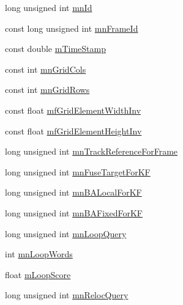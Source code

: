 \begin{DoxyCompactItemize}
\item 
long unsigned int \mbox{\hyperlink{class_o_r_b___s_l_a_m2_1_1_key_frame_a1e3d56caca4e4cc372c36a3270d490c7}{mn\+Id}}
\item 
const long unsigned int \mbox{\hyperlink{class_o_r_b___s_l_a_m2_1_1_key_frame_a75ad29c06d8c969a341d9f633b43569e}{mn\+Frame\+Id}}
\item 
const double \mbox{\hyperlink{class_o_r_b___s_l_a_m2_1_1_key_frame_ab4fa3d61a524547cfe2be2523d199833}{m\+Time\+Stamp}}
\item 
const int \mbox{\hyperlink{class_o_r_b___s_l_a_m2_1_1_key_frame_a7fe0d03aabb1643abb8f4eef33fdf95a}{mn\+Grid\+Cols}}
\item 
const int \mbox{\hyperlink{class_o_r_b___s_l_a_m2_1_1_key_frame_afb859eb91a2365180b006a185aa36ba6}{mn\+Grid\+Rows}}
\item 
const float \mbox{\hyperlink{class_o_r_b___s_l_a_m2_1_1_key_frame_a7ad664a3275b80e901f3fa290ad7804e}{mf\+Grid\+Element\+Width\+Inv}}
\item 
const float \mbox{\hyperlink{class_o_r_b___s_l_a_m2_1_1_key_frame_a89412cd7a6d467c262a7c3a584c81990}{mf\+Grid\+Element\+Height\+Inv}}
\item 
long unsigned int \mbox{\hyperlink{class_o_r_b___s_l_a_m2_1_1_key_frame_a1c775159303dc3435fc05e73f30f2865}{mn\+Track\+Reference\+For\+Frame}}
\item 
long unsigned int \mbox{\hyperlink{class_o_r_b___s_l_a_m2_1_1_key_frame_a2bad332e7057e8f59d630e78c7994129}{mn\+Fuse\+Target\+For\+KF}}
\item 
long unsigned int \mbox{\hyperlink{class_o_r_b___s_l_a_m2_1_1_key_frame_a75767b3e2e5f8eb4b4b73cba161b097b}{mn\+B\+A\+Local\+For\+KF}}
\item 
long unsigned int \mbox{\hyperlink{class_o_r_b___s_l_a_m2_1_1_key_frame_a484457e131f76713de4dc4e0bc9b5fed}{mn\+B\+A\+Fixed\+For\+KF}}
\item 
long unsigned int \mbox{\hyperlink{class_o_r_b___s_l_a_m2_1_1_key_frame_ae3446f5fd861f1e51faf9191c1eb75ab}{mn\+Loop\+Query}}
\item 
int \mbox{\hyperlink{class_o_r_b___s_l_a_m2_1_1_key_frame_a36d7ead1b29c188be610208f11625d24}{mn\+Loop\+Words}}
\item 
float \mbox{\hyperlink{class_o_r_b___s_l_a_m2_1_1_key_frame_a40712f54ab899a6dbd795405a4984ab5}{m\+Loop\+Score}}
\item 
long unsigned int \mbox{\hyperlink{class_o_r_b___s_l_a_m2_1_1_key_frame_a028c2a2f0f737ec09719712c84339748}{mn\+Reloc\+Query}}

\end{DoxyCompactItemize}
